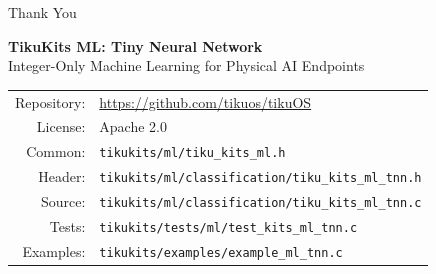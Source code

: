 \documentclass[aspectratio=169, 10pt]{beamer}
\begin{document}
\begin{frame}{Thank You}
\begin{center}
\Large\textbf{TikuKits ML: Tiny Neural Network}\\[0.5em]
\normalsize Integer-Only Machine Learning for Physical AI Endpoints\\[1.5em]

\begin{tabular}{rl}
  Repository: & \url{https://github.com/tikuos/tikuOS} \\
  License:    & Apache 2.0 \\
  Common:     & \texttt{tikukits/ml/tiku\_kits\_ml.h} \\
  Header:     & \texttt{tikukits/ml/classification/tiku\_kits\_ml\_tnn.h} \\
  Source:     & \texttt{tikukits/ml/classification/tiku\_kits\_ml\_tnn.c} \\
  Tests:      & \texttt{tikukits/tests/ml/test\_kits\_ml\_tnn.c} \\
  Examples:   & \texttt{tikukits/examples/example\_ml\_tnn.c} \\
\end{tabular}
\end{center}
\end{frame}
\end{document}
